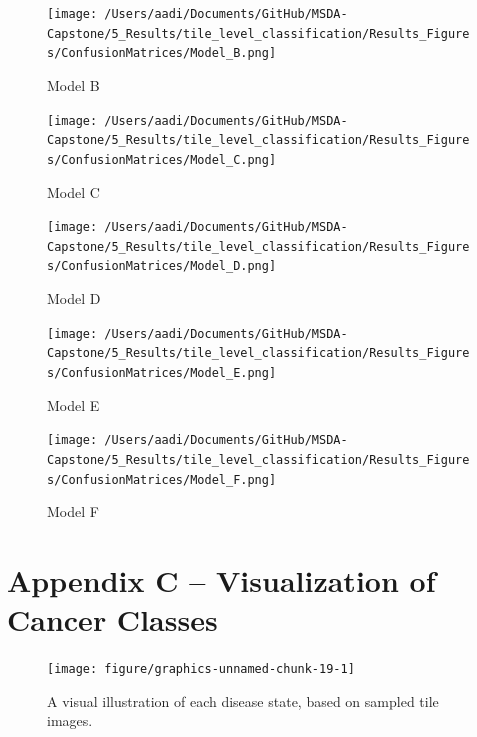 \documentclass[12pt,]{article}
\begin{document}
\begin{figure}[htbp]
\centering
\texttt{[image: /Users/aadi/Documents/GitHub/MSDA-Capstone/5\_Results/tile\_level\_classification/Results\_Figures/ConfusionMatrices/Model\_B.png]}
\caption{Model B}
\end{figure}

\begin{figure}[htbp]
\centering
\texttt{[image: /Users/aadi/Documents/GitHub/MSDA-Capstone/5\_Results/tile\_level\_classification/Results\_Figures/ConfusionMatrices/Model\_C.png]}
\caption{Model C}
\end{figure}

\begin{figure}[htbp]
\centering
\texttt{[image: /Users/aadi/Documents/GitHub/MSDA-Capstone/5\_Results/tile\_level\_classification/Results\_Figures/ConfusionMatrices/Model\_D.png]}
\caption{Model D}
\end{figure}

\begin{figure}[htbp]
\centering
\texttt{[image: /Users/aadi/Documents/GitHub/MSDA-Capstone/5\_Results/tile\_level\_classification/Results\_Figures/ConfusionMatrices/Model\_E.png]}
\caption{Model E}
\end{figure}

\begin{figure}[htbp]
\centering
\texttt{[image: /Users/aadi/Documents/GitHub/MSDA-Capstone/5\_Results/tile\_level\_classification/Results\_Figures/ConfusionMatrices/Model\_F.png]}
\caption{Model F}
\end{figure}

\newpage

\section{Appendix C -- Visualization of Cancer
Classes}\label{appendix-c-visualization-of-cancer-classes}

\begin{figure}[H]

{\centering \texttt{[image: figure/graphics-unnamed-chunk-19-1]} 

}

\caption{A visual illustration of each disease state, based on sampled tile images.}\label{fig:unnamed-chunk-19}
\end{figure}
\end{document}
